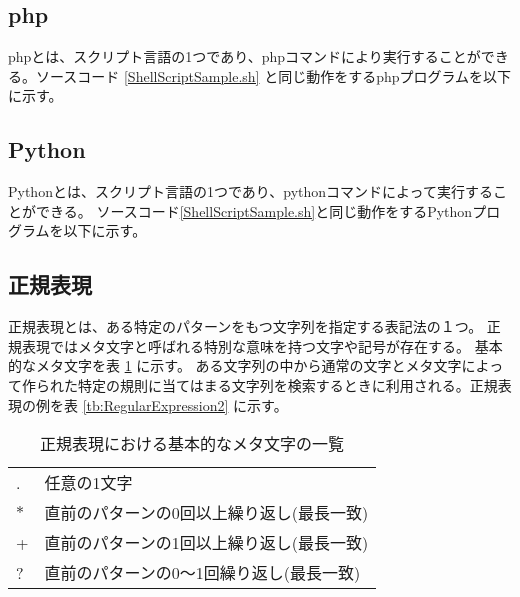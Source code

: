 \subsection{php}
phpとは、スクリプト言語の1つであり、phpコマンドにより実行することができる。ソースコード \ref{ShellScriptSample.sh} と同じ動作をするphpプログラムを以下に示す。



\subsection{Python}
Pythonとは、スクリプト言語の1つであり、pythonコマンドによって実行することができる。
ソースコード\ref{ShellScriptSample.sh}と同じ動作をするPythonプログラムを以下に示す。



\subsection{正規表現}
正規表現とは、ある特定のパターンをもつ文字列を指定する表記法の１つ。
正規表現ではメタ文字と呼ばれる特別な意味を持つ文字や記号が存在する。
基本的なメタ文字を表
\ref{tb:RegularExpression}
に示す。
ある文字列の中から通常の文字とメタ文字によって作られた特定の規則に当てはまる文字列を検索するときに利用される。正規表現の例を表
\ref{tb:RegularExpression2}
に示す。

\begin{table}[t]
\begin{center}
\caption{正規表現における基本的なメタ文字の一覧}
\begin{tabular}{ll} \hline
. & 任意の1文字 \\
$\ast$ & 直前のパターンの0回以上繰り返し(最長一致) \\
+ & 直前のパターンの1回以上繰り返し(最長一致) \\
? & 直前のパターンの0～1回繰り返し(最長一致) \\ \hline
\end{tabular}
\label{tb:RegularExpression}
\end{center}
\end{table}

